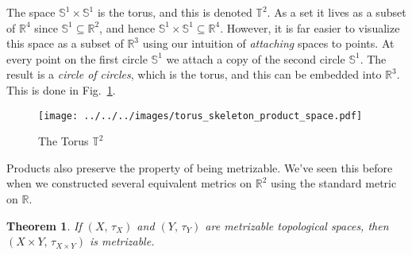 \documentclass{article}
\theoremstyle{plain}
\newtheorem{theorem}{Theorem}[section]
\theoremstyle{normal}
\newenvironment{example}{%
    \pushQED{\qed}\renewcommand{\qedsymbol}{$\blacksquare$}\examplex%
}{%
    \popQED\endexamplex%
}
\begin{document}
        \begin{example}
            The space $\mathbb{S}^{1}\times\mathbb{S}^{1}$ is the torus, and
            this is denoted $\mathbb{T}^{2}$. As a set it lives as a subset of
            $\mathbb{R}^{4}$ since $\mathbb{S}^{1}\subseteq\mathbb{R}^{2}$,
            and hence $\mathbb{S}^{1}\times\mathbb{S}^{1}\subseteq\mathbb{R}^{4}$.
            However, it is far easier to visualize this space as a subset of
            $\mathbb{R}^{3}$ using our intuition of \textit{attaching} spaces
            to points. At every point on the first circle $\mathbb{S}^{1}$
            we attach a copy of the second circle $\mathbb{S}^{1}$. The result
            is a \textit{circle of circles}, which is the torus, and this can
            be embedded into $\mathbb{R}^{3}$. This is done in
            Fig.~\ref{fig:torus_skeleton_product_space}.
        \end{example}
        \begin{figure}
            \centering
            \texttt{[image: ../../../images/torus\_skeleton\_product\_space.pdf]}
            \caption{The Torus $\mathbb{T}^{2}$}
            \label{fig:torus_skeleton_product_space}
        \end{figure}
        Products also preserve the property of being metrizable. We've seen
        this before when we constructed several equivalent metrics on
        $\mathbb{R}^{2}$ using the standard metric on $\mathbb{R}$.
        \begin{theorem}
            If $(X,\,\tau_{X})$ and $(Y,\,\tau_{Y})$ are metrizable topological
            spaces, then $(X\times{Y},\,\tau_{X\times{Y}})$ is metrizable.
        \end{theorem}
\end{document}
